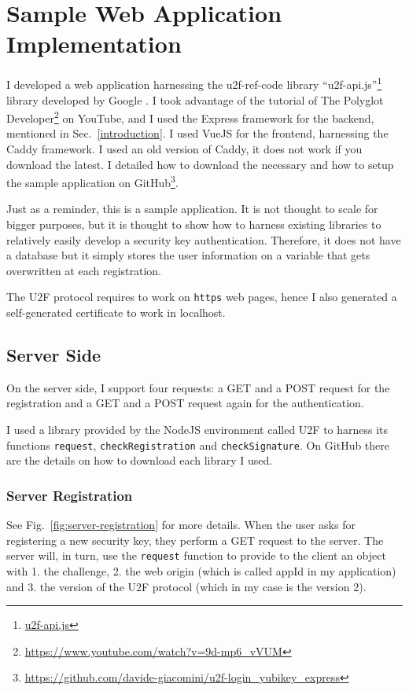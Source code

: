 \section{Sample Web Application Implementation}\label{implementation}
I developed a web application harnessing the u2f-ref-code library ``u2f-api.js''\footnote{\href{https://github.com/google/u2f-ref-code/blob/master/u2f-gae-demo/war/js/u2f-api.js}{u2f-api.js}} library developed by Google \cite{lang2016security}. I took advantage of the tutorial of The Polyglot Developer\footnote{\url{https://www.youtube.com/watch?v=9d-mp6_vVUM}} on YouTube, and I used the Express framework for the backend, mentioned in Sec.~\ref{introduction}. I used VueJS for the frontend, harnessing the Caddy framework. I used an old version of Caddy, it does not work if you download the latest. I detailed how to download the necessary and how to setup the sample application on GitHub\footnote{\url{https://github.com/davide-giacomini/u2f-login_yubikey_express}}.

Just as a reminder, this is a sample application. It is not thought to scale for bigger purposes, but it is thought to show how to harness existing libraries to relatively easily develop a security key authentication. Therefore, it does not have a database but it simply stores the user information on a variable that gets overwritten at each registration.

The U2F protocol requires to work on \texttt{https} web pages, hence I also generated a self-generated certificate to work in localhost.

\subsection{Server Side}\label{server}
On the server side, I support four requests: a \textsc{GET} and a \textsc{POST} request for the registration and a \textsc{GET} and a \textsc{POST} request again for the authentication.

I used a library provided by the NodeJS environment called U2F to harness its functions \texttt{request}, \texttt{checkRegistration} and \texttt{checkSignature}. On GitHub there are the details on how to download each library I used.

\subsubsection{Server Registration}\label{server-registration}
See Fig.~\ref{fig:server-registration} for more details. When the user asks for registering a new security key, they perform a \textsc{GET} request to the server. The server will, in turn, use the \texttt{request} function to provide to the client an object with 1. the challenge, 2. the web origin (which is called appId in my application) and 3. the version of the U2F protocol (which in my case is the version 2).

